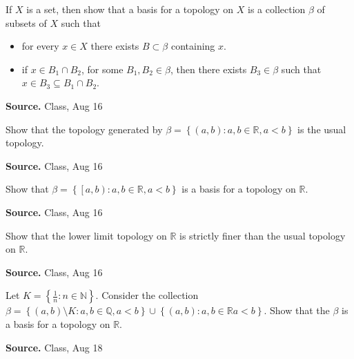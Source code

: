 \documentclass[12pt,twoside]{report}
\newenvironment*{source}{\hfill\scriptsize\textbf{Source.}\space}{\par}
\begin{document}
\begin{samepage}
\begin{ex}
    If $X$ is a set, then show that a basis for a topology on $X$ is a collection $\beta$ of subsets of $X$ such that
    \begin{itemize}
        \item for every $x \in X$ there exists $B \subset \beta$ containing $x$.
        \item if $x \in B_1 \cap B_2$, for some $B_1, B_2 \in \beta$, then there exists $B_3 \in \beta$ such that $x \in B_3 \subseteq B_1 \cap B_2$.
    \end{itemize}
\end{ex}
\begin{source}
    Class, Aug 16
\end{source}
\end{samepage}

\begin{samepage}
\begin{ex}
Show that the topology generated by $\beta = \left\{ \left (a,b\right )  :  a,b \in \mathbb{R}, a < b \right\}$ is the usual topology.
\end{ex}
\begin{source}
Class, Aug 16
\end{source}
\end{samepage}

\begin{samepage}
\begin{ex}
Show that $\beta = \left\{ \left [a, b\right )  :  a, b \in \mathbb{R}, a < b \right\}$ is a basis for a topology on $\mathbb{R}$.
\end{ex}
\begin{source}
Class, Aug 16
\end{source}
\end{samepage}

\begin{samepage}
\begin{ex}
Show that the lower limit topology on $\mathbb{R}$ is strictly finer than the usual topology on $\mathbb{R}$.
\end{ex}
\begin{source}
Class, Aug 16
\end{source}
\end{samepage}

\begin{samepage}
\begin{ex}
    Let $K = \left\{ \frac{1}{n}  :  n \in \mathbb{N} \right\}$. Consider the collection $\beta = \left\{ \left (a, b\right ) \setminus K  :  a,b \in \mathbb{Q}, a < b \right\} \cup \left\{ \left (a,b\right )  :  a,b \in \mathbb{R} a < b \right\}$.  Show that the $\beta$ is a basis for a topology on $\mathbb{R}$.
\end{ex}
\begin{source}
Class, Aug 18
\end{source}
\end{samepage}
\end{document}
